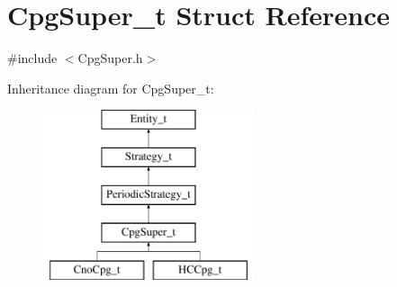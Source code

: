 \hypertarget{structCpgSuper__t}{
\section{CpgSuper\_\-t Struct Reference}
\label{structCpgSuper__t}
}


{\ttfamily \#include $<$CpgSuper.h$>$}

Inheritance diagram for CpgSuper\_\-t:\begin{figure}[H]
\begin{center}
\leavevmode
\includegraphics[height=5.000000cm]{structCpgSuper__t}
\end{center}
\end{figure}
